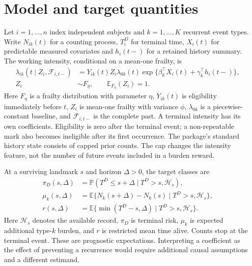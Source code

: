 \documentclass[article,nojss]{jss}
\providecommand{\E}{\mathsf{E}}
\renewcommand{\E}{\mathbb{E}}
\newcommand{\Prb}{\mathbb{P}}
\begin{document}
\section{Model and target quantities}\label{sec:model}
Let $i=1,\ldots,n$ index independent subjects and $k=1,\ldots,K$ recurrent event types. Write $N_{ik}(t)$ for a counting process, $T_i^D$ for terminal time, $X_i(t)$ for predictable measured covariates and $h_i(t-)$ for a retained history summary. The working intensity, conditional on a mean-one frailty, is
\begin{equation}\label{eq:intensity}
\begin{aligned}
\lambda_{ik}(t\mid Z_i,\mathcal F_{i,t-})&=
Y_{ik}(t)Z_i\lambda_{0k}(t)
\exp\{\beta_k^\top X_i(t)+\gamma_k^\top h_i(t-)\},\\
Z_i&\sim F_\eta,\qquad \E_{F_\eta}(Z_i)=1.
\end{aligned}
\end{equation}
Here $F_\eta$ is a frailty distribution with parameter $\eta$, $Y_{ik}(t)$ is eligibility immediately before $t$, $Z_i$ is mean-one frailty with variance $\phi$, $\lambda_{0k}$ is a piecewise-constant baseline, and $\mathcal F_{i,t-}$ is the complete past. A terminal intensity has its own coefficients. Eligibility is zero after the terminal event; a non-repeatable mark also becomes ineligible after its first occurrence. The package's standard history state consists of capped prior counts. The cap changes the intensity feature, not the number of future events included in a burden reward.

At a surviving landmark $s$ and horizon $\Delta>0$, the target classes are
\begin{equation}\label{eq:targets}
\begin{aligned}
\pi_D(s,\Delta)&=\Prb(T^D\leq s+\Delta\mid T^D>s,\mathcal H_s),\\
\mu_k(s,\Delta)&=\E\{N_k(s+\Delta)-N_k(s)\mid T^D>s,\mathcal H_s\},\\
r(s,\Delta)&=\E\{\min(T^D-s,\Delta)\mid T^D>s,\mathcal H_s\}.
\end{aligned}
\end{equation}
Here $\mathcal H_s$ denotes the available record, $\pi_D$ is terminal risk, $\mu_k$ is expected additional type-$k$ burden, and $r$ is restricted mean time alive. Counts stop at the terminal event. These are prognostic expectations. Interpreting a coefficient as the effect of preventing a recurrence would require additional causal assumptions and a different estimand.
\end{document}
